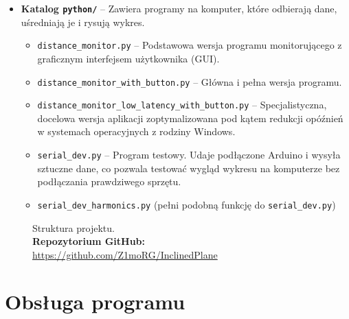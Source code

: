 \documentclass[a4paper,12pt]{article}
\begin{document}
\begin{itemize}
    \item \textbf{Katalog \texttt{python/}} -- Zawiera programy na komputer, które odbierają dane, uśredniają je i rysują wykres.
    \begin{itemize}
        \item \texttt{distance\_monitor.py} -- Podstawowa wersja programu monitorującego z graficznym interfejsem użytkownika (GUI). 
        \item \texttt{distance\_monitor\_with\_button.py} -- Główna i pełna wersja programu.
        \item \texttt{distance\_monitor\_low\_latency\_with\_button.py} -- Specjalistyczna, docelowa wersja aplikacji zoptymalizowana pod kątem redukcji opóźnień w systemach operacyjnych z rodziny Windows. 
        \item \texttt{serial\_dev.py} -- Program testowy. Udaje podłączone Arduino i wysyła sztuczne dane, co pozwala testować wygląd wykresu na komputerze bez podłączania prawdziwego sprzętu.
        \item \texttt{serial\_dev\_harmonics.py} (pełni podobną funkcję do \texttt{serial\_dev.py})
    \end{itemize}
\end{itemize}

\begin{figure}[ht]
\centering
\begin{minipage}{0.6\textwidth} %
\end{minipage}
\captionsetup{justification=centering}
\caption{Struktura projektu.\\ \textbf{Repozytorium GitHub:} \url{https://github.com/Z1moRG/InclinedPlane}}
\end{figure}

\newpage
\section{Obsługa programu}
\end{document}
